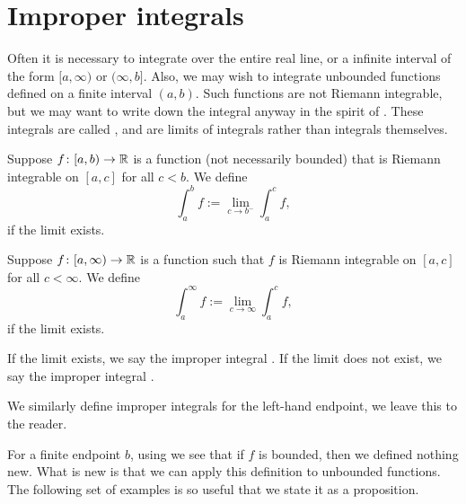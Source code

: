 
\sectionnewpage
\section{Improper integrals}
\label{sec:impropriemann}


Often it is necessary to integrate over the
entire real line, or a infinite interval of the form $[a,\infty)$ or
$(\infty,b]$.  Also, we may wish to integrate unbounded functions
defined on a finite interval $(a,b)$.
Such functions are not Riemann integrable, but we may want to write down
the integral anyway in the spirit of .
These integrals are called \emph{},
and are limits
of integrals rather than integrals themselves.

\begin{defn}
Suppose $f \colon [a,b) \to {\mathbb{R}}$ is a function (not necessarily bounded)
that is Riemann integrable on $[a,c]$ for all $c < b$.  We define
\begin{equation*}
\int_a^b f := \lim_{c \to b^-} \int_a^{c} f ,
\end{equation*}
if the limit exists.

Suppose $f \colon [a,\infty) \to {\mathbb{R}}$ is a function such that
$f$ is Riemann integrable on $[a,c]$ for all $c < \infty$.  
We define
\begin{equation*}
\int_a^\infty f := \lim_{c \to \infty} \int_a^c f ,
\end{equation*}
if the limit exists.

If the limit exists, we say the improper integral
\emph{}.
If the limit does not exist, we say the improper integral
\emph{}.

We similarly define improper integrals for the left-hand endpoint, we leave
this to the reader.
\end{defn}

For a finite endpoint $b$,
using  we see that if
$f$ is bounded, then we defined nothing new.  What is new is that
we can apply this definition to unbounded functions.
The following set of examples is
so useful that we state it as a proposition.

